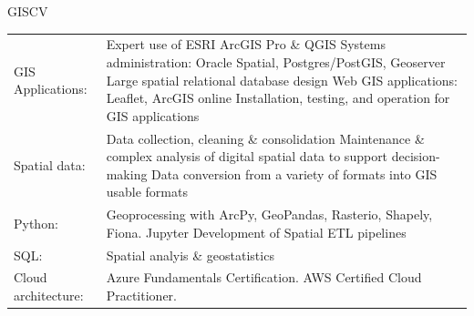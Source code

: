 \documentclass[letterpaper]{article}
\newenvironment{skillslist}
        {
            \begin{tabular}[t]{ l L{5.17in} }
        }{
            \end{tabular}
        }
\begin{document}
    \begin{taggedblock}{GISCV}
        \begin{skillslist}
            GIS Applications:&
                Expert use of ESRI ArcGIS Pro \& QGIS \linebreak
                Systems administration: Oracle Spatial, Postgres/PostGIS, Geoserver \linebreak
                Large spatial relational database design \linebreak
                Web GIS applications: Leaflet, ArcGIS online \linebreak
                Installation, testing, and operation for GIS applications \linebreak
                \\
            Spatial data:&
                Data collection, cleaning \& consolidation \linebreak
                Maintenance \& complex analysis of digital spatial data to support decision-making \linebreak
                Data conversion from a variety of formats into GIS usable formats \linebreak
                \\
            Python:&
                Geoprocessing with ArcPy, GeoPandas, Rasterio, Shapely, Fiona. \linebreak
                Jupyter \linebreak
                Development of Spatial ETL pipelines \linebreak
                \\
            SQL:&
                Spatial analyis \& geostatistics \linebreak
                \\
            Cloud architecture:&
                Azure Fundamentals Certification. \linebreak
                AWS Certified Cloud Practitioner. \linebreak

\end{skillslist}
\end{taggedblock}
\end{document}
